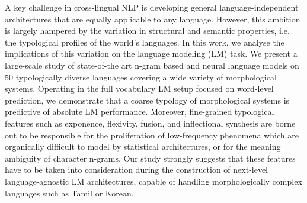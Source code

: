 A key challenge in cross-lingual NLP is developing general language-independent architectures that are equally applicable to any language. However, this ambition is largely hampered by the variation in structural and semantic properties, i.e. the typological profiles of the world's languages. In this work, we analyse the implications of this variation on the language modeling (LM) task. We present a large-scale study of state-of-the art n-gram based and neural language models on 50 typologically diverse languages covering a wide variety of morphological systems. Operating in the full vocabulary LM setup focused on word-level prediction, we demonstrate that a coarse typology of morphological systems is predictive of absolute LM performance. Moreover, fine-grained typological features such as exponence, flexivity, fusion, and inflectional synthesis are borne out to be responsible for the proliferation of low-frequency phenomena which are organically difficult to model by statistical architectures, or for the meaning ambiguity of character n-grams. Our study strongly suggests that these features have to be taken into consideration during the construction of next-level language-agnostic LM architectures, capable of handling morphologically complex languages such as Tamil or Korean.
